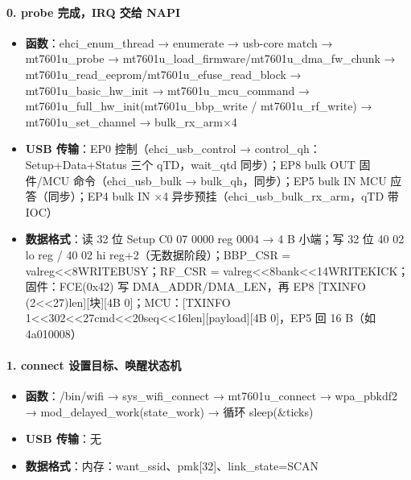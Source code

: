 \documentclass[UTF8,zihao=-4,fontset=none]{ctexart}
\begin{document}
\paragraph*{0. probe 完成，IRQ 交给 NAPI}
\begin{itemize}[leftmargin=2em,itemsep=1pt]
\item \textbf{函数}：ehci\_enum\_thread → enumerate → usb-core match → mt7601u\_probe → mt7601u\_load\_firmware/mt7601u\_dma\_fw\_chunk → mt7601u\_read\_eeprom/mt7601u\_efuse\_read\_block → mt7601u\_basic\_hw\_init → mt7601u\_mcu\_command → mt7601u\_full\_hw\_init(mt7601u\_bbp\_write / mt7601u\_rf\_write) → mt7601u\_set\_channel → bulk\_rx\_arm×4
\item \textbf{USB 传输}：EP0 控制（ehci\_usb\_control → control\_qh：Setup+Data+Status 三个 qTD，wait\_qtd 同步）；EP8 bulk OUT 固件/MCU 命令（ehci\_usb\_bulk → bulk\_qh，同步）；EP5 bulk IN MCU 应答（同步）；EP4 bulk IN ×4 异步预挂（ehci\_usb\_bulk\_rx\_arm，qTD 带 IOC）
\item \textbf{数据格式}：读 32 位 Setup C0 07 0000 reg 0004 → 4 B 小端；写 32 位 40 02 lo reg / 40 02 hi reg+2（无数据阶段）；BBP\_CSR = val\textbar{}reg\textless{}\textless{}8\textbar{}WRITE\textbar{}BUSY；RF\_CSR = val\textbar{}reg\textless{}\textless{}8\textbar{}bank\textless{}\textless{}14\textbar{}WRITE\textbar{}KICK；固件：FCE(0x42) 写 DMA\_ADDR/DMA\_LEN，再 EP8 [TXINFO (2\textless{}\textless{}27)\textbar{}len][块][4B 0]；MCU：[TXINFO 1\textless{}\textless{}30\textbar{}2\textless{}\textless{}27\textbar{}cmd\textless{}\textless{}20\textbar{}seq\textless{}\textless{}16\textbar{}len][payload][4B 0]，EP5 回 16 B（如 4a010008）
\end{itemize}

\paragraph*{1. connect 设置目标、唤醒状态机}
\begin{itemize}[leftmargin=2em,itemsep=1pt]
\item \textbf{函数}：/bin/wifi → sys\_wifi\_connect → mt7601u\_connect → wpa\_pbkdf2 → mod\_delayed\_work(state\_work) → 循环 sleep(\&ticks)
\item \textbf{USB 传输}：无
\item \textbf{数据格式}：内存：want\_ssid、pmk[32]、link\_state=SCAN
\end{itemize}
\end{document}
